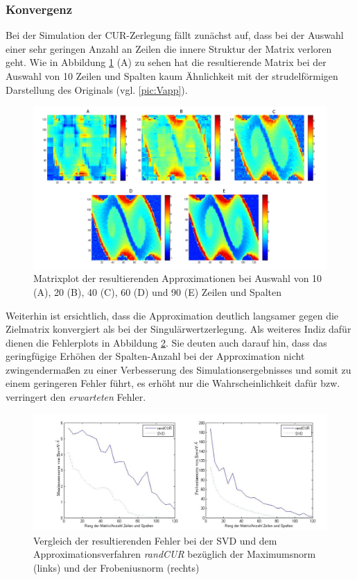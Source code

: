 \documentclass[12pt,a4paper,twoside]{article}
\begin{document}
	\subsubsection*{Konvergenz}
	Bei der Simulation der CUR-Zerlegung fällt zunächst auf, dass bei der Auswahl einer sehr geringen Anzahl an 
	Zeilen die innere Struktur der Matrix verloren geht. Wie in Abbildung \ref{pic:randCUR} (A) zu sehen hat die 
	resultierende Matrix bei der Auswahl von 10 Zeilen und Spalten kaum Ähnlichkeit mit der strudelförmigen Darstellung des Originals (vgl. \ref{pic:Vapp}).
	\begin{figure}[h]
		\center
		\includegraphics[scale=0.4]{randCUR_plots3.png}
		\caption{\label{pic:randCUR}Matrixplot der resultierenden Approximationen bei Auswahl von 10 (A), 20 (B), 40 (C), 60 (D) und 90 
		(E) Zeilen und Spalten}
	\end{figure} 
	Weiterhin ist ersichtlich, dass die Approximation deutlich langsamer gegen die Zielmatrix konvergiert als bei der 
	Singulärwertzerlegung. Als weiteres Indiz dafür dienen die Fehlerplots in Abbildung \ref{pic:randCUR_graph}. Sie 
	deuten auch darauf hin, dass das geringfügige Erhöhen der Spalten-Anzahl bei der Approximation nicht 
	zwingendermaßen zu einer Verbesserung des Simulationsergebnisses und somit zu einem geringeren Fehler führt, es 
	erhöht nur die Wahrscheinlichkeit dafür bzw. verringert den \textit{erwarteten} Fehler.
	\begin{figure}[h]
		\center
		\includegraphics[scale=0.4]{randCUR_graphen}
		\caption{\label{pic:randCUR_graph}Vergleich der resultierenden Fehler bei der SVD und dem  Approximationsverfahren \textit{randCUR} bezüglich der Maximumsnorm (links) und der Frobeniusnorm (rechts)}
	\end{figure}
\newpage
\end{document}
